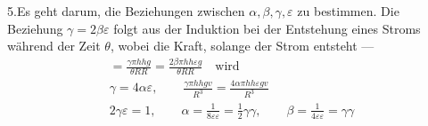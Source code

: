 5.\quad Es geht darum, die Beziehungen zwischen $\alpha,\beta,\gamma,\varepsilon$ zu bestimmen. Die Beziehung $\gamma=2\beta\varepsilon$ folgt aus der Induktion bei der Entstehung eines Stroms während der Zeit $\theta$, wobei die Kraft, solange der Strom entsteht —
\[
\begin{gathered}
=\frac{\gamma\pi hhg}{\theta RR}=\frac{2\beta\pi hh\varepsilon g}{\theta RR}\quad\text{wird}\\[6pt]
\gamma=4\alpha\varepsilon,\qquad\frac{\gamma\pi hhgv}{R^3}=\frac{4\alpha\pi hh\varepsilon gv}{R^3}\\[6pt]
2\gamma\varepsilon=1,\qquad\alpha=\frac{1}{8\varepsilon\varepsilon}=\tfrac{1}{2}\gamma\gamma,\qquad\beta=\frac{1}{4\varepsilon\varepsilon}=\gamma\gamma
\end{gathered}
\]

